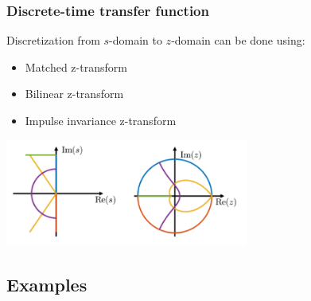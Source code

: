 \subsubsection{Discrete-time transfer function}
Discretization from $s$-domain to $z$-domain can be done using:
\begin{itemize}
	\item Matched z-transform
	\item Bilinear z-transform
	\item Impulse invariance z-transform
\end{itemize}
\begin{center}
	\includegraphics[width=0.6\textwidth]{Images/s-to-z.png}
\end{center}

\subsection{Examples}

